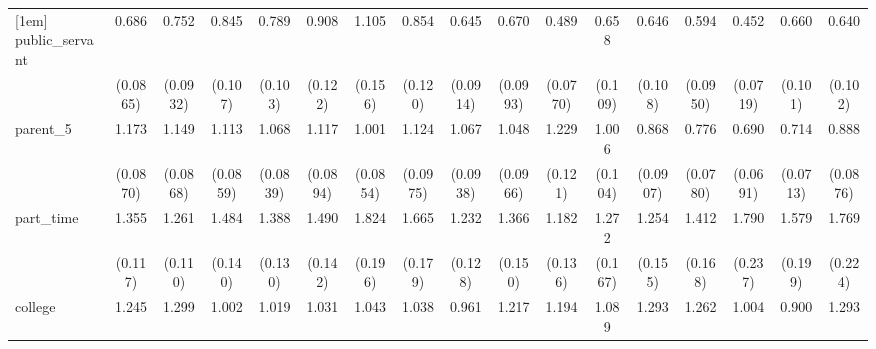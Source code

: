 {\begin{tabular}{l*{16}{c}}
[1em]
public\_servant      &       0.686\sym{**} &       0.752\sym{*}  &       0.845         &       0.789         &       0.908         &       1.105         &       0.854         &       0.645\sym{**} &       0.670\sym{**} &       0.489\sym{***}&       0.658\sym{*}  &       0.646\sym{**} &       0.594\sym{**} &       0.452\sym{***}&       0.660\sym{**} &       0.640\sym{**} \\
                    &    (0.0865)         &    (0.0932)         &     (0.107)         &     (0.103)         &     (0.122)         &     (0.156)         &     (0.120)         &    (0.0914)         &    (0.0993)         &    (0.0770)         &     (0.109)         &     (0.108)         &    (0.0950)         &    (0.0719)         &     (0.101)         &     (0.102)         \\
[1em]
parent\_5            &       1.173\sym{*}  &       1.149         &       1.113         &       1.068         &       1.117         &       1.001         &       1.124         &       1.067         &       1.048         &       1.229\sym{*}  &       1.006         &       0.868         &       0.776\sym{*}  &       0.690\sym{***}&       0.714\sym{***}&       0.888         \\
                    &    (0.0870)         &    (0.0868)         &    (0.0859)         &    (0.0839)         &    (0.0894)         &    (0.0854)         &    (0.0975)         &    (0.0938)         &    (0.0966)         &     (0.121)         &     (0.104)         &    (0.0907)         &    (0.0780)         &    (0.0691)         &    (0.0713)         &    (0.0876)         \\
[1em]
part\_time           &       1.355\sym{***}&       1.261\sym{**} &       1.484\sym{***}&       1.388\sym{***}&       1.490\sym{***}&       1.824\sym{***}&       1.665\sym{***}&       1.232\sym{*}  &       1.366\sym{**} &       1.182         &       1.272         &       1.254         &       1.412\sym{**} &       1.790\sym{***}&       1.579\sym{***}&       1.769\sym{***}\\
                    &     (0.117)         &     (0.110)         &     (0.140)         &     (0.130)         &     (0.142)         &     (0.196)         &     (0.179)         &     (0.128)         &     (0.150)         &     (0.136)         &     (0.167)         &     (0.155)         &     (0.168)         &     (0.237)         &     (0.199)         &     (0.224)         \\
[1em]
college             &       1.245\sym{*}  &       1.299\sym{**} &       1.002         &       1.019         &       1.031         &       1.043         &       1.038         &       0.961         &       1.217         &       1.194         &       1.089         &       1.293\sym{*}  &       1.262         &       1.004         &       0.900         &       1.293         \\

\end{tabular}}
